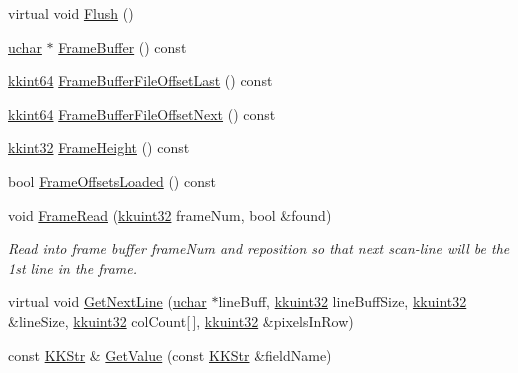 \begin{DoxyCompactItemize}
\item 
virtual void \hyperlink{class_k_k_l_s_c_1_1_scanner_file_ac4c3bbfa85b34618661f31c2f2610e7d}{Flush} ()
\item 
\hyperlink{namespace_k_k_b_ace9969169bf514f9ee6185186949cdf7}{uchar} $\ast$ \hyperlink{class_k_k_l_s_c_1_1_scanner_file_a834fa07b083e775d1e7005a58a21835e}{Frame\+Buffer} () const 
\item 
\hyperlink{namespace_k_k_b_aa3486b1c5ea9162b3b020c69f72826eb}{kkint64} \hyperlink{class_k_k_l_s_c_1_1_scanner_file_a0f56170c04cc54cb9ae444f4d00872bf}{Frame\+Buffer\+File\+Offset\+Last} () const 
\item 
\hyperlink{namespace_k_k_b_aa3486b1c5ea9162b3b020c69f72826eb}{kkint64} \hyperlink{class_k_k_l_s_c_1_1_scanner_file_a96222460fb27ab84b6e943e16d5d9d9d}{Frame\+Buffer\+File\+Offset\+Next} () const 
\item 
\hyperlink{namespace_k_k_b_a8fa4952cc84fda1de4bec1fbdd8d5b1b}{kkint32} \hyperlink{class_k_k_l_s_c_1_1_scanner_file_af0f28398959bf85ab3d190f0185c8f7f}{Frame\+Height} () const 
\item 
bool \hyperlink{class_k_k_l_s_c_1_1_scanner_file_a743a12856f26d2ca07d8c7c6f44c2c43}{Frame\+Offsets\+Loaded} () const 
\item 
void \hyperlink{class_k_k_l_s_c_1_1_scanner_file_a0c815c55eae67de241d347018474891a}{Frame\+Read} (\hyperlink{namespace_k_k_b_af8d832f05c54994a1cce25bd5743e19a}{kkuint32} frame\+Num, bool \&found)
\begin{DoxyCompactList}\small\item\em Read into frame buffer \textquotesingle{}frame\+Num\textquotesingle{} and reposition so that next scan-\/line will be the 1st line in the frame. \end{DoxyCompactList}\item 
virtual void \hyperlink{class_k_k_l_s_c_1_1_scanner_file_a4148a86bd1175370ea9c5735c9605812}{Get\+Next\+Line} (\hyperlink{namespace_k_k_b_ace9969169bf514f9ee6185186949cdf7}{uchar} $\ast$line\+Buff, \hyperlink{namespace_k_k_b_af8d832f05c54994a1cce25bd5743e19a}{kkuint32} line\+Buff\+Size, \hyperlink{namespace_k_k_b_af8d832f05c54994a1cce25bd5743e19a}{kkuint32} \&line\+Size, \hyperlink{namespace_k_k_b_af8d832f05c54994a1cce25bd5743e19a}{kkuint32} col\+Count\mbox{[}$\,$\mbox{]}, \hyperlink{namespace_k_k_b_af8d832f05c54994a1cce25bd5743e19a}{kkuint32} \&pixels\+In\+Row)
\item 
const \hyperlink{class_k_k_b_1_1_k_k_str}{K\+K\+Str} \& \hyperlink{class_k_k_l_s_c_1_1_scanner_file_af2e9f699efe5e935b6faf245f832ff59}{Get\+Value} (const \hyperlink{class_k_k_b_1_1_k_k_str}{K\+K\+Str} \&field\+Name)

\end{DoxyCompactItemize}
